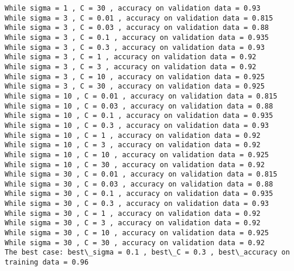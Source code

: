 \documentclass[11pt]{article}
\begin{document}
\begin{Verbatim}[commandchars=\\\{\}]
While sigma = 1 , C = 30 , accuracy on validation data = 0.93
While sigma = 3 , C = 0.01 , accuracy on validation data = 0.815
While sigma = 3 , C = 0.03 , accuracy on validation data = 0.88
While sigma = 3 , C = 0.1 , accuracy on validation data = 0.935
While sigma = 3 , C = 0.3 , accuracy on validation data = 0.93
While sigma = 3 , C = 1 , accuracy on validation data = 0.92
While sigma = 3 , C = 3 , accuracy on validation data = 0.92
While sigma = 3 , C = 10 , accuracy on validation data = 0.925
While sigma = 3 , C = 30 , accuracy on validation data = 0.925
While sigma = 10 , C = 0.01 , accuracy on validation data = 0.815
While sigma = 10 , C = 0.03 , accuracy on validation data = 0.88
While sigma = 10 , C = 0.1 , accuracy on validation data = 0.935
While sigma = 10 , C = 0.3 , accuracy on validation data = 0.93
While sigma = 10 , C = 1 , accuracy on validation data = 0.92
While sigma = 10 , C = 3 , accuracy on validation data = 0.92
While sigma = 10 , C = 10 , accuracy on validation data = 0.925
While sigma = 10 , C = 30 , accuracy on validation data = 0.92
While sigma = 30 , C = 0.01 , accuracy on validation data = 0.815
While sigma = 30 , C = 0.03 , accuracy on validation data = 0.88
While sigma = 30 , C = 0.1 , accuracy on validation data = 0.935
While sigma = 30 , C = 0.3 , accuracy on validation data = 0.93
While sigma = 30 , C = 1 , accuracy on validation data = 0.92
While sigma = 30 , C = 3 , accuracy on validation data = 0.92
While sigma = 30 , C = 10 , accuracy on validation data = 0.925
While sigma = 30 , C = 30 , accuracy on validation data = 0.92
The best case: best\_sigma = 0.1 , best\_C = 0.3 , best\_accuracy on training data = 0.96

    \end{Verbatim}

    \begin{center}
    \end{center}
    { \hspace*{\fill} \\}
    
\end{document}
